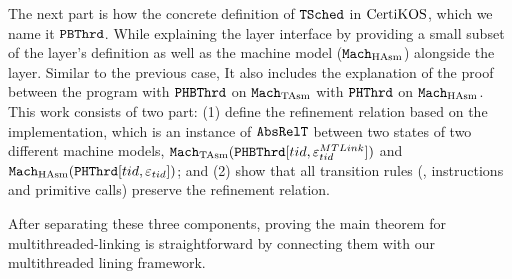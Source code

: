 The next part is how the concrete definition of  ${{\mathrm{\texttt{TSched}}}}$ in $\mathrm{CertiKOS}$, which we name it ${\mathrm{\texttt{PBThrd}}}$. 
While explaining the layer interface by providing a small subset of the layer's definition as well as the machine model (${\mathrm{\texttt{Mach}}}_{\mathrm{HAsm}}$)
alongside the layer.
Similar to the previous case, 
It also includes  the explanation of the proof between the program with  ${\mathrm{\texttt{PHBThrd}}}$ on ${\mathrm{\texttt{Mach}}}_{\mathrm{TAsm}}$ 
with ${\mathrm{\texttt{PHThrd}}}$ on ${\mathrm{\texttt{Mach}}}_{\mathrm{HAsm}}$. 
This work consists of two part:  (1) define the refinement relation based on the implementation, which is an instance of ${\mathrm{\texttt{AbsRelT}}}$ between two states of two different machine models,
${\mathrm{\texttt{Mach}}}_{\mathrm{TAsm}}({\mathrm{\texttt{PHBThrd}}}[tid, {\varepsilon}^{MTLink}_{tid}])$ and 
${\mathrm{\texttt{Mach}}}_{\mathrm{HAsm}}({\mathrm{\texttt{PHThrd}}}[tid, {\varepsilon}_{tid}])$; and 
(2) show that all transition rules (\ie, instructions and primitive calls) preserve the refinement relation. 

After separating these three components, proving the main theorem for multithreaded-linking is straightforward by connecting 
them with our multithreaded lining framework.
